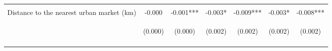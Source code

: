 \begin{center}
\begin{tabular}{lcccccc}
\vspace{4pt} & \begin{footnotesize}[0.007]\end{footnotesize} & \begin{footnotesize}[0.008]\end{footnotesize} & \begin{footnotesize}[0.675]\end{footnotesize} & \begin{footnotesize}[0.712]\end{footnotesize} & \begin{footnotesize}[0.829]\end{footnotesize} & \begin{footnotesize}[0.867]\end{footnotesize} \\
Distance to the nearest urban market (km) & -0.000 & -0.001*** & -0.003* & -0.009*** & -0.003* & -0.008*** \\
 & \begin{footnotesize}(0.000)\end{footnotesize} & \begin{footnotesize}(0.000)\end{footnotesize} & \begin{footnotesize}(0.002)\end{footnotesize} & \begin{footnotesize}(0.002)\end{footnotesize} & \begin{footnotesize}(0.002)\end{footnotesize} & \begin{footnotesize}(0.002)\end{footnotesize} \\
\vspace{4pt} & \begin{footnotesize}[0.146]\end{footnotesize} & \begin{footnotesize}[0.000]\end{footnotesize} & \begin{footnotesize}[0.089]\end{footnotesize} & \begin{footnotesize}[0.000]\end{footnotesize} & \begin{footnotesize}[0.087]\end{footnotesize} & \begin{footnotesize}[0.000]\end{footnotesize} \\

\end{tabular}
\end{center}
